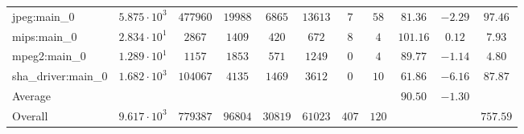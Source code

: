 \begin{tabular}{|l|c|c|c|c|c|c|c|c|c|c|}
jpeg:main\_0            & $ 5.875 \cdot 10^{3} $ & $ 477960 $ & $ 19988 $ & $ 6865  $ & $ 13613 $ & $ 7   $ & $ 58  $ & $ 81.36       $ & $ -2.29   $ & $ 97.46   $ \\
mips:main\_0            & $ 2.834 \cdot 10^{1} $ & $ 2867   $ & $ 1409  $ & $ 420   $ & $ 672   $ & $ 8   $ & $ 4   $ & $ 101.16      $ & $ 0.12    $ & $ 7.93    $ \\
mpeg2:main\_0           & $ 1.289 \cdot 10^{1} $ & $ 1157   $ & $ 1853  $ & $ 571   $ & $ 1249  $ & $ 0   $ & $ 4   $ & $ 89.77       $ & $ -1.14   $ & $ 4.80    $ \\
sha\_driver:main\_0     & $ 1.682 \cdot 10^{3} $ & $ 104067 $ & $ 4135  $ & $ 1469  $ & $ 3612  $ & $ 0   $ & $ 10  $ & $ 61.86       $ & $ -6.16   $ & $ 87.87   $ \\
\hline
Average                 & $                    $ & $        $ & $       $ & $       $ & $       $ & $     $ & $     $ & $ 90.50       $ & $ -1.30   $ & $         $ \\
\hline
Overall                 & $ 9.617 \cdot 10^{3} $ & $ 779387 $ & $ 96804 $ & $ 30819 $ & $ 61023 $ & $ 407 $ & $ 120 $ & $             $ & $         $ & $ 757.59  $ \\
\hline
\end{tabular}
